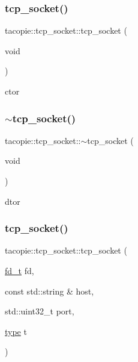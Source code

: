 \subsubsection{\texorpdfstring{tcp\+\_\+socket()}{tcp\_socket()}\hspace{0.1cm}{\footnotesize\ttfamily [1/4]}}
{\footnotesize\ttfamily tacopie\+::tcp\+\_\+socket\+::tcp\+\_\+socket (\begin{DoxyParamCaption}\item[{void}]{ }\end{DoxyParamCaption})}



ctor 

\mbox{\label{classtacopie_1_1tcp__socket_a4bd737a76a2a326be03d704f79a35282}} 
\subsubsection{\texorpdfstring{$\sim$tcp\+\_\+socket()}{~tcp\_socket()}}
{\footnotesize\ttfamily tacopie\+::tcp\+\_\+socket\+::$\sim$tcp\+\_\+socket (\begin{DoxyParamCaption}\item[{void}]{ }\end{DoxyParamCaption})\hspace{0.3cm}{\ttfamily [default]}}



dtor 

\mbox{\label{classtacopie_1_1tcp__socket_a191ffa48e0753ad4ec87d4d3a4a97822}} 
\subsubsection{\texorpdfstring{tcp\+\_\+socket()}{tcp\_socket()}\hspace{0.1cm}{\footnotesize\ttfamily [2/4]}}
{\footnotesize\ttfamily tacopie\+::tcp\+\_\+socket\+::tcp\+\_\+socket (\begin{DoxyParamCaption}\item[{\hyperlink{namespacetacopie_acce7ad26b2d30156b1e6fa353f727026}{fd\+\_\+t}}]{fd,  }\item[{const std\+::string \&}]{host,  }\item[{std\+::uint32\+\_\+t}]{port,  }\item[{\hyperlink{classtacopie_1_1tcp__socket_ad8376e85df96ab9523f5d079ed7172ab}{type}}]{t }\end{DoxyParamCaption})}

